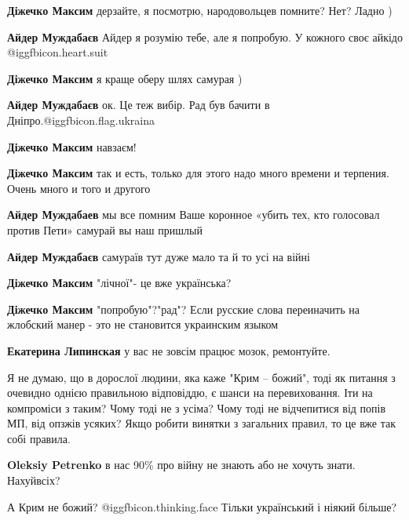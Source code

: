 \begin{itemize}
\begin{itemize} %

\textbf{Діжечко Максим} дерзайте, я посмотрю, народовольцев помните? Нет? Ладно )


\textbf{Айдер Муждабаєв} Айдер я розумію тебе, але я попробую. У кожного своє айкідо  @igg{fbicon.heart.suit}


\textbf{Діжечко Максим} я краще оберу шлях самурая )


\textbf{Айдер Муждабаєв} ок. Це теж вибір. Рад був бачити в Дніпро.@igg{fbicon.flag.ukraina}

\textbf{Діжечко Максим} навзаєм!

\textbf{Діжечко Максим} так и есть, только для этого надо много времени и терпения. Очень много и того и другого

\textbf{Айдер Муждабаев} мы все помним Ваше коронное «убить тех, кто голосовал против Пети» самурай вы наш пришлый

\textbf{Айдер Муждабаєв} самураїв тут дуже мало та й то усі на війні

\textbf{Діжечко Максим} "лічної"- це вже українська?

\textbf{Діжечко Максим} "попробую"?"рад"?
Если русские слова переиначить на жлобский манер - это не становится украинским языком

\textbf{Екатерина Липинская} у вас не зовсім працює мозок, ремонтуйте.
\end{itemize} %


Я не думаю, що в дорослої людини, яка каже "Крим – божий", тоді як питання з
очевидно однією правильною відповіддю, є шанси на перевиховання. Іти на
компроміси з таким? Чому тоді не з усіма? Чому тоді не відчепитися від попів
МП, від опзжів усяких? Якщо робити винятки з загальних правил, то це вже так
собі правила.

\begin{itemize} %
\textbf{Oleksiy Petrenko} в нас 90\% про війну не знають або не хочуть знати. Нахуйвсіх?

А Крим не божий?  @igg{fbicon.thinking.face}  Тільки український і ніякий більше?


\end{itemize}
\end{itemize}

